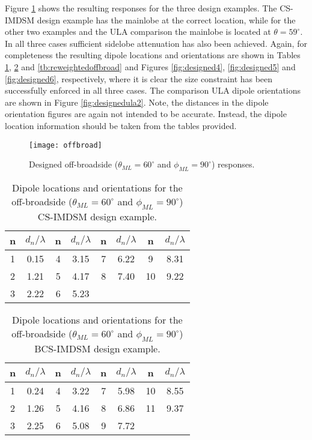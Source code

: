 \documentclass[10pt,final]{IEEEtran}
\begin{document}
Figure \ref{fig:offbroad} shows the resulting responses for the three design examples.  The CS-IMDSM design example has the mainlobe at the correct location, while for the other two examples and the ULA comparison the mainlobe is located at $\theta=59^{\circ}$.  In all three cases sufficient sidelobe attenuation has also been achieved.  Again, for completeness the resulting dipole locations and orientations are shown in Tables \ref{tb:CSoffbroad}, \ref{tb:BCSoffbroad} and \ref{tb:reweightedoffbroad} and Figures \ref{fig:designed4}, \ref{fig:designed5} and \ref{fig:designed6}, respectively, where it is clear the size constraint has been successfully enforced in all three cases.  The comparison ULA dipole orientations are shown in Figure \ref{fig:designedula2}.  Note, the distances in the dipole orientation figures are again not intended to be accurate.  Instead, the dipole location information should be taken from the tables provided.
\begin{figure}
\begin{center}
   \texttt{[image: offbroad]}
   \caption{Designed off-broadside ($\theta_{ML}=60^{\circ}$ and $\phi_{ML}=90^{\circ}$) responses.
    \label{fig:offbroad}}
\end{center}
\end{figure}

\begin{table}
\caption{\rm Dipole locations and orientations for the off-broadside ($\theta_{ML}=60^{\circ}$ and $\phi_{ML}=90^{\circ}$) CS-IMDSM design example.} \centering
\begin{tabular}{|c|c|c|c|c|c|c|c|}\hline
n  & $d_{n}/\lambda$ &  n & $d_{n}/\lambda$ &  n & $d_{n}/\lambda$ & n & $d_{n}/\lambda$\\
\hline
1  & 0.15   &  4 &   3.15   &  7 &  6.22  & 9 & 8.31 \\
\hline
2  &1.21  &  5  &   4.17   &  8 &  7.40  & 10 & 9.22 \\
\hline
3  & 2.22 &   6  &   5.23    \\
\cline{1-4}
\end{tabular}
\label{tb:CSoffbroad}
\end{table}


\begin{table}
\caption{\rm Dipole locations and orientations for the off-broadside ($\theta_{ML}=60^{\circ}$ and $\phi_{ML}=90^{\circ}$) BCS-IMDSM design example.} \centering
\begin{tabular}{|c|c|c|c|c|c|c|c|}\hline
n  & $d_{n}/\lambda$ &  n & $d_{n}/\lambda$ &  n & $d_{n}/\lambda$ & n & $d_{n}/\lambda$\\
\hline
1  & 0.24   &  4 &   3.22   &  7 &  5.98  & 10 & 8.55 \\
\hline
2  &1.26  &  5  &   4.16   &  8 &  6.86  & 11 & 9.37 \\
\hline
3  & 2.25 &   6  &   5.08  &  9 &   7.72  \\
\cline{1-6}
\end{tabular}
\label{tb:BCSoffbroad}
\end{table}
\end{document}
